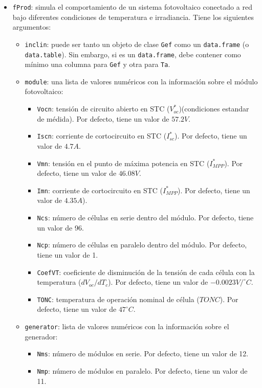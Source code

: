 \begin{itemize}
\item \texttt{fProd}: simula el comportamiento de un sistema fotovoltaico conectado a red bajo diferentes condiciones de temperatura e irradiancia. Tiene los siguientes argumentos:
\begin{itemize}
\item \texttt{inclin}: puede ser tanto un objeto de clase \texttt{Gef} como un \texttt{data.frame} (o \texttt{data.table}). Sin embargo, si es un \texttt{data.frame}, debe contener como mínimo una columna para \texttt{Gef} y otra para \texttt{Ta}.
\item \texttt{module}: una lista de valores numéricos con la información sobre el módulo fotovoltaico:
\begin{itemize}
\item \texttt{Vocn}: tensión de circuito abierto en STC (\(V_{oc}^*\))(condiciones estandar de médida). Por defecto, tiene un valor de \(57.2V\).
\item \texttt{Iscn}: corriente de cortocircuito en STC (\(I_{sc}^*\)). Por defecto, tiene un valor de \(4.7A\).
\item \texttt{Vmn}: tensión en el punto de máxima potencia en STC (\(I_{MPP}^*\)). Por defecto, tiene un valor de \(46.08V\).
\item \texttt{Imn}: corriente de cortocircuito en STC (\(I_{MPP}^*\)). Por defecto, tiene un valor de \(4.35A\)).
\item \texttt{Ncs}: número de células en serie dentro del módulo. Por defecto, tiene un valor de 96.
\item \texttt{Ncp}: número de células en paralelo dentro del módulo. Por defecto, tiene un valor de 1.
\item \texttt{CoefVT}: coeficiente de disminución de la tensión  de cada célula con la temperatura (\(dV_{oc}/dT_c\)). Por defecto, tiene un valor de \(-0.0023 V/^\circ C\).
\item \texttt{TONC}: temperatura de operación nominal de célula (\(TONC\)). Por defecto, tiene un valor de \(47^\circ C\).
\end{itemize}
\item \texttt{generator}: lista de valores numéricos con la información sobre el generador:
\begin{itemize}
\item \texttt{Nms}: número de módulos en serie. Por defecto, tiene un valor de 12.
\item \texttt{Nmp}: número de módulos en paralelo. Por defecto, tiene un valor de 11.

\end{itemize}
\end{itemize}
\end{itemize}
